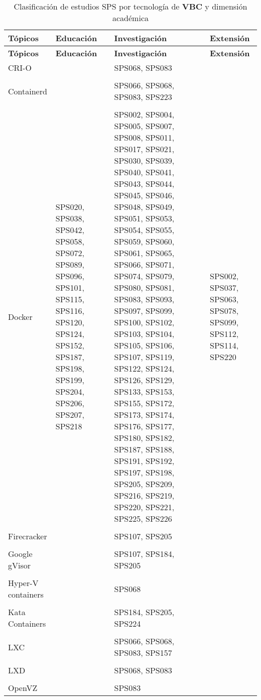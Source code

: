 \begin{longtable}{Z Y Y Y}
\caption{Clasificación de estudios SPS por tecnología de \textbf{VBC} y dimensión académica}\label{tab:clasificacion-topicos} \\

\toprule
\textbf{Tópicos} & \textbf{Educación} & \textbf{Investigación} & \textbf{Extensión} \\
\midrule
\endfirsthead

\toprule
\textbf{Tópicos} & \textbf{Educación} & \textbf{Investigación} & \textbf{Extensión} \\
\midrule
\endhead

CRI-O & & SPS068, SPS083 & \\
\\
Containerd & & SPS066, SPS068, SPS083, SPS223 & \\
\\
Docker & SPS020, SPS038, SPS042, SPS058, SPS072, SPS089, SPS096, SPS101, SPS115, SPS116, SPS120, SPS124, SPS152, SPS187, SPS198, SPS199, SPS204, SPS206, SPS207, SPS218 
& SPS002, SPS004, SPS005, SPS007, SPS008, SPS011, SPS017, SPS021, SPS030, SPS039, SPS040, SPS041, SPS043, SPS044, SPS045, SPS046, SPS048, SPS049, SPS051, SPS053, SPS054, SPS055, SPS059, SPS060, SPS061, SPS065, SPS066, SPS071, SPS074, SPS079, SPS080, SPS081, SPS083, SPS093, SPS097, SPS099, SPS100, SPS102, SPS103, SPS104, SPS105, SPS106, SPS107, SPS119, SPS122, SPS124, SPS126, SPS129, SPS133, SPS153, SPS155, SPS172, SPS173, SPS174, SPS176, SPS177, SPS180, SPS182, SPS187, SPS188, SPS191, SPS192, SPS197, SPS198, SPS205, SPS209, SPS216, SPS219, SPS220, SPS221, SPS225, SPS226 
& SPS002, SPS037, SPS063, SPS078, SPS099, SPS112, SPS114, SPS220 \\
\\
Firecracker & & SPS107, SPS205 & \\
\\
Google gVisor & & SPS107, SPS184, SPS205 & \\
\\
Hyper-V containers & & SPS068 & \\
\\
Kata Containers & & SPS184, SPS205, SPS224 & \\
\\
LXC & & SPS066, SPS068, SPS083, SPS157 & \\
\\
LXD & & SPS068, SPS083 & \\
\\
OpenVZ & & SPS083 & \\

\end{longtable}
